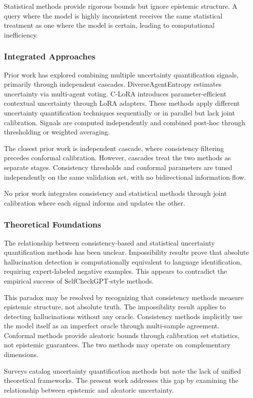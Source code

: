 Statistical methods provide rigorous bounds but ignore epistemic structure. A query where the model is highly inconsistent receives the same statistical treatment as one where the model is certain, leading to computational inefficiency.

\subsubsection{Integrated Approaches}

Prior work has explored combining multiple uncertainty quantification signals, primarily through independent cascades. DiverseAgentEntropy \citep{liu2024diverseagent} estimates uncertainty via multi-agent voting. C-LoRA \citep{jin2024clora} introduces parameter-efficient contextual uncertainty through LoRA adapters. These methods apply different uncertainty quantification techniques sequentially or in parallel but lack joint calibration. Signals are computed independently and combined post-hoc through thresholding or weighted averaging.

The closest prior work is independent cascade, where consistency filtering precedes conformal calibration. However, cascades treat the two methods as separate stages. Consistency thresholds and conformal parameters are tuned independently on the same validation set, with no bidirectional information flow.

No prior work integrates consistency and statistical methods through joint calibration where each signal informs and updates the other.

\subsubsection{Theoretical Foundations}

The relationship between consistency-based and statistical uncertainty quantification methods has been unclear. Impossibility results \citep{karbasi2025impossibility} prove that absolute hallucination detection is computationally equivalent to language identification, requiring expert-labeled negative examples. This appears to contradict the empirical success of SelfCheckGPT-style methods.

This paradox may be resolved by recognizing that consistency methods measure epistemic structure, not absolute truth. The impossibility result applies to detecting hallucinations without any oracle. Consistency methods implicitly use the model itself as an imperfect oracle through multi-sample agreement. Conformal methods provide aleatoric bounds through calibration set statistics, not epistemic guarantees. The two methods may operate on complementary dimensions.

Surveys \citep{kang2025uq_survey} catalog uncertainty quantification methods but note the lack of unified theoretical frameworks. The present work addresses this gap by examining the relationship between epistemic and aleatoric uncertainty.
